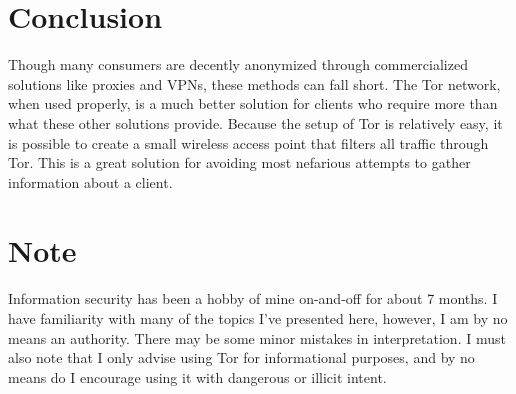 \documentclass{article}
\begin{document}

%


\section*{Conclusion}

Though many consumers are decently anonymized through commercialized solutions like proxies and VPNs, these methods can fall short. The Tor network, when used properly, is a much better solution for clients who require more than what these other solutions provide. Because the setup of Tor is relatively easy, it is possible to create a small wireless access point that filters all traffic through Tor. This is a great solution for avoiding most nefarious attempts to gather information about a client.


\section*{Note}

Information security has been a hobby of mine on-and-off for about 7 months. I have familiarity with many of the topics I've presented here, however, I am by no means an authority. There may be some minor mistakes in interpretation. I must also note that I only advise using Tor for informational purposes, and by no means do I encourage using it with dangerous or illicit intent.






%
%
\end{document}

